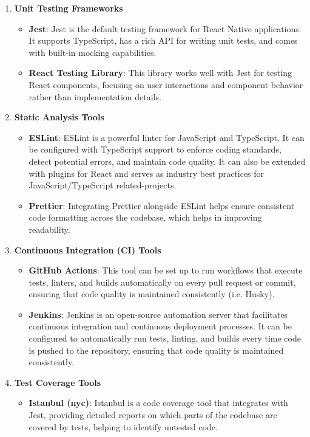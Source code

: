 \documentclass[12pt, titlepage]{article}
\begin{document}
\begin{enumerate}
	\item \textbf{Unit Testing Frameworks}
	\begin{itemize}
		\item \textbf{Jest}: Jest is the default testing framework for React Native applications. It supports TypeScript, has a rich API for writing unit tests, and comes with built-in mocking capabilities.
		\item \textbf{React Testing Library}: This library works well with Jest for testing React components, focusing on user interactions and component behavior rather than implementation details.
	\end{itemize}
	\item \textbf{Static Analysis Tools}
	\begin{itemize}
		\item \textbf{ESLint}: ESLint is a powerful linter for JavaScript and TypeScript. It can be configured with TypeScript support to enforce coding standards, detect potential errors, and maintain code quality. It can also be extended with plugins for React and serves as industry best practices for JavaScript/TypeScript related-projects.
		\item \textbf{Prettier}: Integrating Prettier alongside ESLint helps ensure consistent code formatting across the codebase, which helps in improving readability.
	\end{itemize}
	\item \textbf{Continuous Integration (CI) Tools}
	\begin{itemize}
		\item \textbf{GitHub Actions}: This tool can be set up to run workflows that execute tests, linters, and builds automatically on every pull request or commit, ensuring that code quality is maintained consistently (i.e. Husky).
		\item \textbf{Jenkins}: Jenkins is an open-source automation server that facilitates continuous integration and continuous deployment processes. It can be configured to automatically run tests, linting, and builds every time code is pushed to the repository, ensuring that code quality is maintained consistently.
	\end{itemize}
	\item \textbf{Test Coverage Tools}
	\begin{itemize}
		\item \textbf{Istanbul (nyc)}: Istanbul is a code coverage tool that integrates with Jest, providing detailed reports on which parts of the codebase are covered by tests, helping to identify untested code.

\end{itemize}
\end{enumerate}
\end{document}
